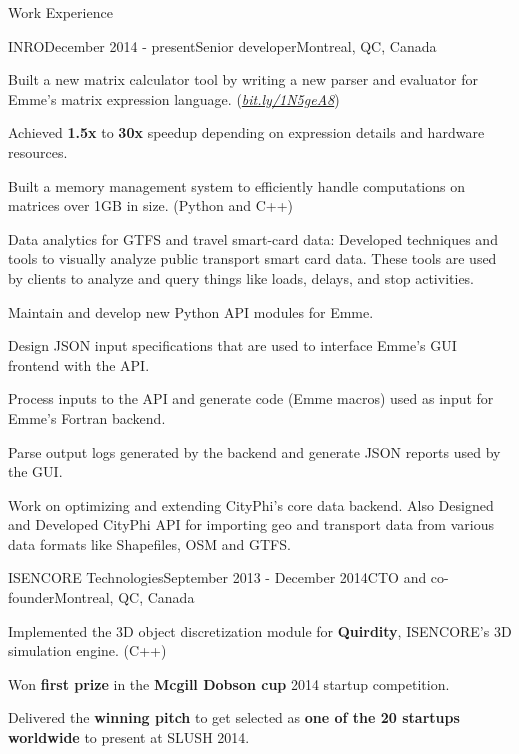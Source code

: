 \documentclass{resume} %
\begin{document}
\begin{rSection}{Work Experience}

\begin{rSubsection}{INRO}{December 2014 - present}{Senior developer}{Montreal,
  QC, Canada}
\item Built a new matrix calculator tool by writing a new parser and evaluator
	for Emme's matrix expression language.%
	(\href{http://bit.ly/1N5geA8}{\em{bit.ly/1N5geA8}})
\begin{lsubSubsection} 
\item Achieved \textbf{1.5x} to \textbf{30x} speedup depending on expression
	details and hardware resources.
\item Built a memory management system to efficiently handle computations on
        matrices over 1GB in size. (Python and C++) 
\end{lsubSubsection}
\item Data analytics for GTFS and travel smart-card data: Developed techniques
        and tools to visually analyze public transport smart card data. These
        tools are used by clients to analyze and query things like loads,
        delays, and stop activities.
\item Maintain and develop new Python API modules for Emme.  
\begin{lsubSubsection}
\item Design JSON input specifications that are used to interface Emme's GUI
	frontend with the API. 
\item Process inputs to the API and generate code (Emme macros) used as input
	for Emme's Fortran backend.
\item Parse output logs generated by the backend and generate JSON reports used
        by the GUI.
\end{lsubSubsection}
\item Work on optimizing and extending CityPhi's core data backend. Also
        Designed and Developed CityPhi API for importing geo and transport data
        from various data formats like Shapefiles, OSM and GTFS.
\end{rSubsection}

\begin{rSubsection}{ISENCORE Technologies}{September 2013 - December 2014}{CTO
  and co-founder}{Montreal, QC, Canada}
\item Implemented the 3D object discretization module for \textbf{Quirdity},
        ISENCORE's 3D simulation engine. (C++)
\item Won \textbf{first prize} in the \textbf{Mcgill Dobson cup} 2014 startup competition. 
\item Delivered the \textbf{winning pitch} to get selected as \textbf{one of the 20 startups
  worldwide} to present at SLUSH 2014.
\end{rSubsection}


\end{rSection}
\end{document}
